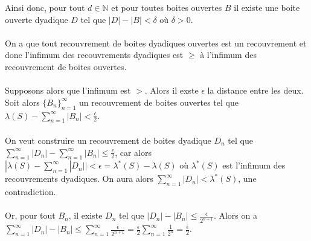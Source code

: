 \documentclass[a4paper,10pt]{article}
\begin{document}
Ainsi donc, pour tout $d \in \mathbb{N}$ et pour toutes boites ouvertes $B$ il existe une boite ouverte dyadique $D$ tel que $|D| - |B| < \delta$ où $\delta > 0$.
\\
\\
On a que tout recouvrement de boites dyadiques ouvertes est un recouvrement et donc l'infimum des recouvrements dyadiques est $\geq$ à l'infimum des recouvrement de boites ouvertes. 
\\
\\
Supposons alors que l'infimum est $>$. Alors il exste $\epsilon$ la distance entre les deux. Soit alors $\{B_n\}_{n=1}^\infty$ un recouvrement de boites ouvertes tel que $\lambda (S) - \sum_{n=1}^\infty |B_n| < \frac{\epsilon}{2}$.
\\
\\
On veut construire un recouvrement de boites dyadique $D_n$ tel que $\sum_{n=1}^\infty |D_n| - \sum_{n=1}^\infty |B_n| \leq \frac{\epsilon}{2}$, car alors $|\lambda (S) - \sum_{n=1}^\infty |D_n| |  < \epsilon = \lambda^* (S) - \lambda (S)$ où $\lambda^* (S)$ est l'infimum des recouvrements dyadiques. On aura alors $\sum_{n=1}^\infty |D_n| < \lambda^* (S)$, une contradiction.
\\
\\
Or, pour tout $B_n$, il existe $D_n$ tel que $|D_n| - |B_n| \leq \frac{\epsilon}{2^{n+1}}$. Alors on a $\sum_{n=1}^\infty |D_n| - |B_n| \leq \sum_{n=1}^\infty \frac{\epsilon}{2^{n+1}} = \frac{\epsilon}{2}\sum_{n=1}^\infty \frac{1}{2^n} = \frac{\epsilon}{2}$.
\end{document}
